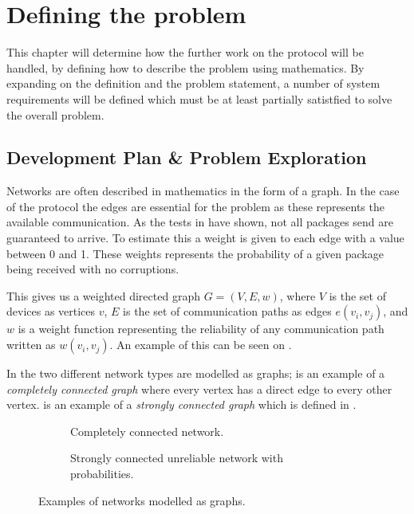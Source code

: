 \chapter{Defining the problem}
This chapter will determine how the further work on the protocol will be handled, by defining how to describe the problem using mathematics. 
By expanding on the definition and the problem statement, a number of system requirements will be defined which must be at least partially satistfied to solve the overall problem.


\section{Development Plan \& Problem Exploration}\label{chp:Problems}
Networks are often described in mathematics in the form of a graph. 
In the case of the protocol the edges are essential for the problem as these represents the available communication.
As the tests in  have shown, not all packages send are guaranteed to arrive.
To estimate this a weight is given to each edge with a value between 0 and 1.
These weights represents the probability of a given package being received with no corruptions.

This gives us a weighted directed graph $G = (V, E, w)$, where $V$ is the set of devices as vertices $v$, $E$ is the set of communication paths as edges $e(v_i, v_j)$, and $w$ is a weight function representing the reliability of any communication path written as $w(v_i,v_j)$.
An example of this can be seen on .

In  the two different network types are modelled as graphs; 
 is an example of a \emph{completely connected graph} where every vertex has a direct edge to every other vertex.
 is an example of a \emph{strongly connected graph} which is defined in .

\begin{figure}[h]
    \begin{subfigure}{0.5\linewidth}
        \centering
        
        \caption{Completely connected network.}
        \label{fig:ccrcnetworkgraph}
    \end{subfigure}\hfill
    \begin{subfigure}{0.5\linewidth}
        \centering
        
        \caption{Strongly connected unreliable network with probabilities.}
        \label{fig:network}
    \end{subfigure}
    \caption{Examples of networks modelled as graphs.}
    \label{fig:examplenetworkgraphs} 
\end{figure}


